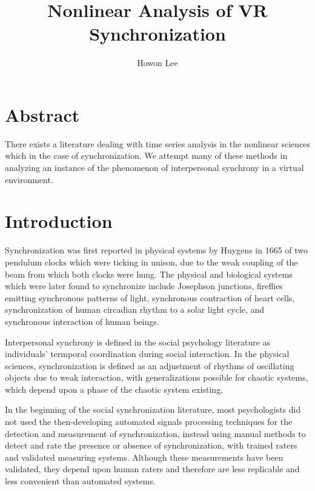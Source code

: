 \documentclass[12pt]{article}
\begin{document}
\title{Nonlinear Analysis of VR Synchronization}
\author{Howon Lee}
\maketitle

\section{Abstract}
There exists a literature dealing with time series analysis in the nonlinear sciences which in the case of synchronization. We attempt many of these methods in analyzing an instance of the phenomenon of interpersonal synchrony in a virtual environment.%


\section{Introduction}

Synchronization was first reported in physical systems by Huygens in 1665 of two pendulum clocks which were ticking in unison, due to the weak coupling of the beam from which both clocks were hung. The physical and biological systems which were later found to synchronize include Josephson junctions, fireflies emitting synchronous patterns of light, synchronous contraction of heart cells, synchronization of human circadian rhythm to a solar light cycle, and synchronous interaction of human beings. %

Interpersonal synchrony is defined in the social psychology literature as individuals' termporal coordination during social interaction. In the physical sciences, synchronization is defined as an adjustment of rhythms of oscillating objects due to weak interaction, with generalizations possible for chaotic systems, which depend upon a phase of the chaotic system existing. %


In the beginning of the social synchronization literature, most psychologists did not used the then-developing automated signals processing techniques for the detection and measurement of synchronization, instead using manual methods to detect and rate the presence or absence of synchronization, with trained raters and validated measuring systems. Although these measurements have been validated, they depend upon human raters and therefore are less replicable and less convenient than automated systems. %
\end{document}
